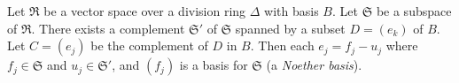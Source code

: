 Let $\mathfrak{R}$ be a vector space over a division ring $\Delta$ with basis $B$. Let $\mathfrak{S}$ be a subspace of $\mathfrak{R}$. There exists a complement $\mathfrak{S}'$ of $\mathfrak{S}$ spanned by a subset $D = (e_k)$ of $B$. Let $C = (e_j)$ be the complement of $D$ in $B$. Then each $e_j = f_j - u_j$ where $f_j \in \mathfrak{S}$ and $u_j \in \mathfrak{S}'$, and $(f_j)$ is a basis for $\mathfrak{S}$ (a \textit{Noether basis}).
